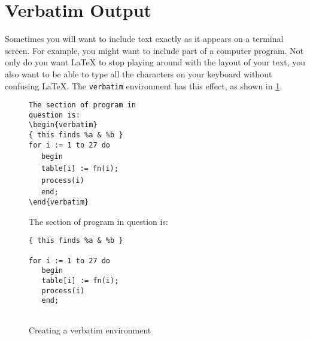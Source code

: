 \section{Verbatim Output}
Sometimes you will want to include text exactly as it appears on a
terminal screen.
For example, you might want to include part of a computer program.
Not only do you want \LaTeX{} to stop playing around with the layout
of your text, you also want to be able to type all the characters
on your keyboard without confusing \LaTeX.
The {\tt verbatim} environment has this effect,
as shown in \ref{fig:verbatim}.
\begin{figure}
\footnotesize
\begin{minipage}[t]{0.48\textwidth}
\begin{flushleft}
\verb|The section of program in|  \\
\verb|question is:|               \\
\verb|\begin{verbatim}|           \\
\verb|{ this finds %a & %b }|     \\[2ex]
 
\verb|for i := 1 to 27 do|        \\
\ \ \ \verb|begin|                \\
\ \ \ \verb|table[i] := fn(i);|   \\
\ \ \ \verb|process(i)|           \\
\ \ \ \verb|end;|                 \\
\verb|\end{verbatim}|
\end{flushleft}
\end{minipage}\hfill
\begin{minipage}[t]{0.48\textwidth}
The section of program in
question is:
\begin{verbatim}
{ this finds %a & %b }
 
for i := 1 to 27 do
   begin
   table[i] := fn(i);
   process(i)
   end;
 
\end{verbatim}
\end{minipage}
\vspace{1em}
\caption{Creating a verbatim environment}
\label{fig:verbatim}
\end{figure}
 
